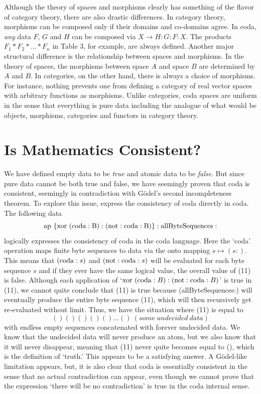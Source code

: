 \documentclass[11pt]{article}
\begin{document}
    Although the theory of spaces and morphisms clearly has something of the flavor of category theory, there are
also drastic differences.  In category theory, morphisms can be composed only if their domains and co-domains
agree.  In coda, {\it any} data $F$, $G$ and $H$ can be composed via
$X\rightarrow H:G:F:X$.  The products $F_1*F_2*\dots *F_n$ in Table 3,
for example, are always defined.  Another major structural difference
is the relationship between spaces and morphisms.  In the theory of spaces, the morphisms between space
$A$ and space $B$ are determined by $A$ and $B$.  In categories, on the other hand, there is always a choice of morphisms.  
For instance, nothing prevents one from defining a category
of real vector spaces with arbitrary functions as morphisms.  Unlike categories, coda spaces are
uniform in the sense that everything is pure data including the analogue of what would be objects, morphisms,
categories and functors in category theory.  

\section{Is Mathematics Consistent?}

     We have defined empty data to be {\it true} and atomic data to be {\it false}.  But since pure data
cannot be both true and false, we have seemingly proven that coda is consistent, seemingly
in contradiction with G\"{o}del's second incompleteness theorem.  To explore this issue,
express the consistency of coda directly in coda.  The following data
\begin{equation}\label{eqn}
{\rm ap\ \{xor\ (coda:B) : (not:coda:B) \} : allByteSequences :}
\end{equation}
logically expresses the consistency of coda in the coda language.  Here the `coda' operation maps
finite byte sequences to data via the onto mapping $s\mapsto (s:)$.  This means that $({\rm coda}:s)$ and
$({\rm not}:{\rm coda}:s)$ will be evaluated for each byte sequence $s$ and if they ever have the same logical
value, the overall value of (11) is false.   Although each application of `${\rm xor}\ ({\rm coda}:B) : ({\rm not}:{\rm coda}:B)$'
is true in (11), we cannot quite conclude that (11) is true because (allByteSequences:) will
eventually produce the entire byte sequence (11), which will then recursively get re-evaluated
without limit.  Thus, we have the situation where (11) is equal to
\begin{equation}\label{eqn}
() () () () () \dots ()\  (some\ undecided\ data)
\end{equation}
with endless empty sequences concatenated with forever undecided data.
We know that the undecided data will never produce an atom, but we also know that it will never disappear,
meaning that (11) never quite becomes equal to (), which is the definition of `truth.'  This appears
to be a satisfying answer.  A G\"{o}del-like limitation appears, but, it is also clear that coda
is essentially consistent in the sense that no actual contradiction can appear, even though we
cannot prove that the expression `there will be no contradiction' is true in the coda internal sense.
\end{document}
